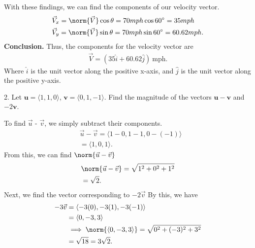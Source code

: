 \documentclass{report}
\begin{document}
    \bigbreak \noindent 
    With these findings, we can find the components of our velocity vector.
    \begin{align*}
        &\vec{V}_{x} = \norm{\vec{V}}\cos{\theta } = 70mph\cos{60^{\circ}} = 35mph \\
        &\vec{V}_{y} = \norm{\vec{V}}\sin{\theta } = 70mph\sin{60^{\circ}} = 60.62mph
    .\end{align*}
    \bigbreak \noindent 
    \textbf{Conclusion.} Thus, the components for the velocity vector are
    \begin{align*}
        \vec{V} = (35\hat{i} + 60.62\hat{j})\ \text{mph}
    .\end{align*}
    Where $\hat{i}$ is the unit vector along the positive x-axis, and $\hat{j}$ is the unit vector along the positive y-axis.

    \pagebreak \bigbreak \noindent 
    \begin{mdframed}
        2. Let $\mathbf{u} = \langle 1, 1, 0 \rangle$, $\mathbf{v} = \langle 0, 1, -1 \rangle$. Find the magnitude of the vectors $\mathbf{u} - \mathbf{v}$ and $-2\mathbf{v}$.
    \end{mdframed}
    \bigbreak \noindent 
    To find $\vec{u}$  - $\vec{v}$, we simply subtract their components.
    \begin{align*}
        &\vec{u} - \vec{v} = \langle 1-0, 1-1, 0-(-1)\rangle \\
        &=\langle 1,0,1\rangle
    .\end{align*}
    From this, we can find $\norm{\vec{u} - \vec{v}}$
    \begin{align*}
        &\norm{\vec{u} - \vec{v}} = \sqrt{1^{2} + 0^{2} + 1^{2}} \\
        &=\sqrt{2}
    .\end{align*}
    \bigbreak \noindent 
    Next, we find the vector corresponding to $-2\vec{v}$
    \bigbreak \noindent 
    By this, we have 
    \begin{align*}
        -3\vec{v} &= \left\langle -3(0), -3(1), -3(-1) \right\rangle  \\
       &=\left\langle 0,-3,3 \right\rangle \\
       &\implies \norm{\left\langle 0,-3,3 \right\rangle} = \sqrt{0^{2} + (-3)^{2} + 3^{2}} \\
       &=\sqrt{18} = 3\sqrt{2}
    .\end{align*}
\end{document}
